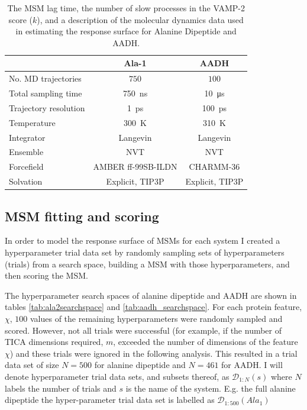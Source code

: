 \begin{table}
    \centering
    \caption{The MSM lag time, the number of slow processes in the VAMP-2 score ($k$), and a description of the molecular dynamics data used in estimating the response surface for Alanine Dipeptide and AADH.}
    \begin{tabular}{|l|c|c|}
        \hline
         & Ala-1 & AADH \\
         \hline\hline
         No. MD trajectories & $750$ & $100$ \\
         Total sampling time & \SI{750}{\nano\second} & \SI{10}{\micro\second} \\
         Trajectory resolution & \SI{1}{\pico\second} & \SI{100}{\pico\second} \\
         Temperature & \SI{300}{\kelvin} & \SI{310}{\kelvin} \\
         Integrator & Langevin & Langevin \\
         Ensemble & NVT & NVT \\
         Forcefield & AMBER ff-99SB-ILDN & CHARMM-36 \\
         Solvation & Explicit, TIP3P & Explicit, TIP3P \\
         \hline
    \end{tabular}
    \label{tab:md_specs}
\end{table}

\subsection{MSM fitting and scoring}\label{sec:msm_fitting}
In order to  model the response surface of MSMs for each system I created a hyperparameter trial data set by randomly sampling sets of hyperparameters (trials) from a search space, building a MSM with those hyperparameters, and then scoring the MSM. 

The hyperparameter search spaces of alanine dipeptide and AADH are shown in tables \ref{tab:ala2searchspace} and \ref{tab:aadh_searchspace}. For each protein feature, $\chi$, $100$ values of the remaining hyperparameters were randomly sampled and scored. However, not all trials were successful (for example, if the number of TICA dimensions required, $m$, exceeded the number of dimensions of the feature $\chi$) and these trials were ignored in the following analysis. This resulted in a trial data set of size $N=500$ for alanine dipeptide and $N=461$ for AADH. I will denote hyperparameter trial data sets, and subsets thereof, as $\mathcal{D}_{1:N}(s)$ where $N$ labels the number of trials and $s$ is the name of the system. E.g. the full alanine dipeptide the hyper-parameter trial data set is labelled as $\mathcal{D}_{1:500}(Ala_{1})$

